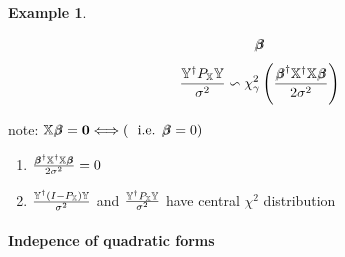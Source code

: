 \documentclass{article}
\newtheorem{example}[theorem]{Example}
\begin{document}
\begin{example}
\begin{enumerate}
\begin{eqnarray*}
\beta\mkern-9.6mu \beta%
\end{eqnarray*}%
\begin{equation*}
\therefore \frac{\mathbb{Y}^{\dagger }P_{\mathbb{X}}\mathbb{Y}}{\sigma ^{2}}%
\backsim \chi _{\gamma }^{2}\left( \frac{%
\beta\mkern-9.6mu \beta%
^{\dagger }\mathbb{X}^{\dagger }\mathbb{X}%
\beta\mkern-9.6mu \beta%
}{2\sigma ^{2}}\right)
\end{equation*}
\end{enumerate}
\end{example}

\bigskip

note: $\mathbb{X}%
\beta\mkern-9.6mu \beta%
=\boldsymbol{0}\Longleftrightarrow \left( \text{i.e. }%
\beta\mkern-9.6mu \beta%
=0\right) $

\begin{enumerate}
\item $\frac{%
\beta\mkern-9.6mu \beta%
^{\dagger }\mathbb{X}^{\dagger }\mathbb{X}%
\beta\mkern-9.6mu \beta%
}{2\sigma ^{2}}=0$

\item $\frac{\mathbb{Y}^{\dagger }\left( I-P_{\mathbb{X}}\right) \mathbb{Y}}{%
\sigma ^{2}}$ and $\frac{\mathbb{Y}^{\dagger }P_{\mathbb{X}}\mathbb{Y}}{%
\sigma ^{2}}$ have central $\chi ^{2}$ distribution
\end{enumerate}

\bigskip

\paragraph{Indepence of quadratic forms}
\end{document}
